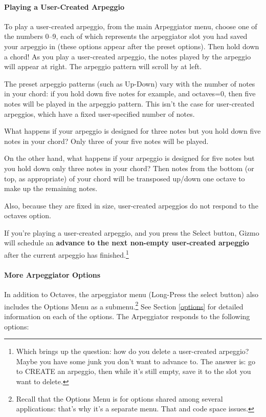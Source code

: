 \documentclass{article}
\newcommand\bump{\vspace{11in}}
\begin{document}
\paragraph{Playing a User-Created Arpeggio}

To play a user-created arpeggio, from the main Arpeggiator menu, choose one of the numbers 0--9, each of which represents the arpeggiator slot you had saved your arpeggio in (these options appear after the preset options).  Then hold down a chord!  As you play a user-created arpeggio, the notes played by the arpeggio will appear at right.  The arpeggio pattern will scroll by at left.


The preset arpeggio patterns (such as Up-Down) vary with the number of notes in your chord: if you hold down five notes for example, and octaves=0, then five notes will be played in the arpeggio pattern.  This isn't the case for user-created arpeggios, which have a fixed user-specified number of notes.

What happens if your arpeggio is designed for three notes but you hold down  five notes in your chord?  Only three of your five notes will be played.

\bump

On the other hand, what happens if your arpeggio is designed for five notes but you hold down only three notes in your chord?  Then notes from the bottom (or top, as appropriate) of your chord will be transposed up/down one octave to make up the remaining notes.

Also, because they are fixed in size, user-created arpeggios do not respond to the octaves option.

If you're playing a user-created arpeggio, and you press the Select button, Gizmo will schedule an {\bf advance to the next non-empty user-created arpeggio} after the current arpeggio has finished.\footnote{Which brings up the question: how do you delete a user-created arpeggio?  Maybe you have some junk you don't want to advance to.  The answer is: go to CREATE an arpeggio, then while it's still empty, save it to the slot you want to delete.}

\paragraph{More Arpeggiator Options}

In addition to Octaves, the arpeggiator menu (Long-Press the select button) also includes the Options Menu as a submenu.\footnote{Recall that the Options Menu is for options shared among several applications: that's why it's a separate menu.  That and code space issues.}  See Section \ref{options} for detailed information on each of the options.  The Arpeggiator responds to the following options:
\end{document}

